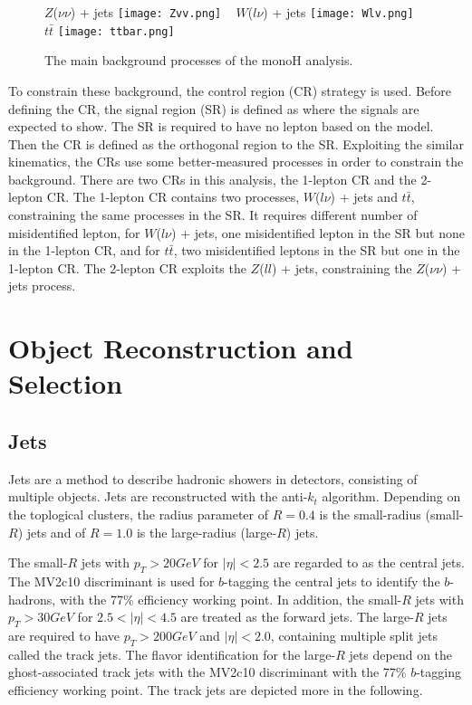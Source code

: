 \documentclass[class=NTHU_thesis, crop=false]{standalone}
\begin{document}
\begin{figure}[!hbt]
	\captionsetup[subfigure]{labelformat=empty}
	\centering
	\subcaptionbox
	{$Z$($\nu\nu$) + jets
		\label{fig:subfig_fig1}}
	{\texttt{[image: Zvv.png]}}
	~
	\subcaptionbox
	{$W$($l\nu$) + jets
		\label{fig:subfig_fig2}}
	{\texttt{[image: Wlv.png]}}
	~
	\subcaptionbox
	{$t\bar{t}$
		\label{fig:subfig_fig3}}
	{\texttt{[image: ttbar.png]}}
	\caption{The main background processes of the monoH analysis.}
	\label{fig:label}
\end{figure}

To constrain these background, the control region (CR) strategy is used. Before defining the CR, the signal region (SR) is defined as where the signals are expected to show. The SR is required to have no lepton based on the model. Then the CR is defined as the orthogonal region to the SR. Exploiting the similar kinematics, the CRs use some better-measured processes in order to constrain the background. There are two CRs in this analysis, the 1-lepton CR and the 2-lepton CR. The 1-lepton CR contains two processes, $W$($l\nu$) + jets and $t\bar{t}$, constraining the same processes in the SR. It requires different number of misidentified lepton, for $W$($l\nu$) + jets, one misidentified lepton in the SR but none in the 1-lepton CR, and for $t\bar{t}$, two misidentified leptons in the SR but one in the 1-lepton CR. The 2-lepton CR exploits the $Z$($ll$) + jets, constraining the $Z$($\nu\nu$) + jets process.

\section{Object Reconstruction and Selection}
\subsection{Jets}
Jets are a method to describe hadronic showers in detectors, consisting of multiple objects. Jets are reconstructed with the anti-$k_t$ algorithm. Depending on the toplogical clusters, the radius parameter of $R = 0.4$ is the small-radius (small-$R$) jets and of $R = 1.0$ is the large-radius (large-$R$) jets.

The small-$R$ jets with $p_T > 20 GeV$ for $\left|\eta\right| < 2.5$ are regarded to as the central jets. The MV2c10 discriminant is used for $b$-tagging the central jets to identify the $b$-hadrons, with the 77\% efficiency working point. In addition, the small-$R$ jets with $p_T > 30 GeV$ for $2.5 < \left|\eta\right| < 4.5$ are treated as the forward jets. The large-$R$ jets are required to have $p_T > 200 GeV$ and $\left|\eta\right| < 2.0$, containing multiple split jets called the track jets. The flavor identification for the large-$R$ jets depend on the ghost-associated track jets with the MV2c10 discriminant with the 77\% $b$-tagging efficiency working point. The track jets are depicted more in the following.
\end{document}
